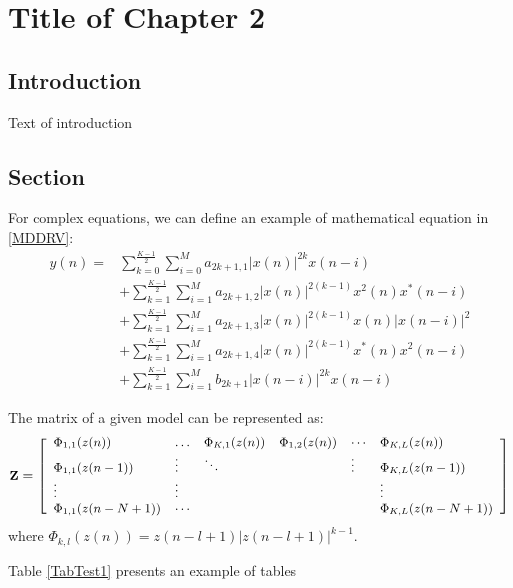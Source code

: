 \chapter{Title of Chapter 2}

\section{Introduction}

Text of introduction

\section{Section}

For complex equations, we can define an example of mathematical equation in \eqref{MDDRV}:
\begin{equation}
	\label{MDDRV}
	\begin{split}
		y(n)=&\sum_{k=0}^{\frac{K-1}{2}}\sum_{i=0}^{M}a_{2k+1,1}|x(n)|^{2k}x(n-i)\\
		&+\sum_{k=1}^{\frac{K-1}{2}}\sum_{i=1}^{M}a_{2k+1,2}|x(n)|^{2(k-1)}x^2(n)x^*(n-i)\\
		&+\sum_{k=1}^{\frac{K-1}{2}}\sum_{i=1}^{M}a_{2k+1,3}|x(n)|^{2(k-1)}x(n)|x(n-i)|^2\\
		&+\sum_{k=1}^{\frac{K-1}{2}}\sum_{i=1}^{M}a_{2k+1,4}|x(n)|^{2(k-1)}x^*(n)x^2(n-i)\\
		&+\sum_{k=1}^{\frac{K-1}{2}}\sum_{i=1}^{M}b_{2k+1}|x(n-i)|^{2k}x(n-i)
	\end{split}
\end{equation}

The matrix of a given model can be represented as:
\begin{equation}
	\small
	\textbf{Z}=\left[
	\begin{array}{llllll}
		\Phi_{1,1}(z(n)) & \dots & \Phi_{K,1}(z(n)) & \Phi_{1,2}(z(n)) & \cdots & \Phi_{K,L}(z(n)) \\
		\Phi_{1,1}(z(n-1)) & \vdots & \ddots &  & \vdots & \Phi_{K,L}(z(n-1)) \\
		\vdots & \vdots &  &  &  & \vdots \\
		\Phi_{1,1}(z(n-N+1)) & \cdots &  &  &  & \Phi_{K,L}(z(n-N+1)) \\ %
	\end{array}
	\right]
\end{equation}
where $\Phi_{k,l}(z(n))=z(n-l+1)|z(n-l+1)|^{k-1}$.

Table \ref{TabTest1} presents an example of tables

